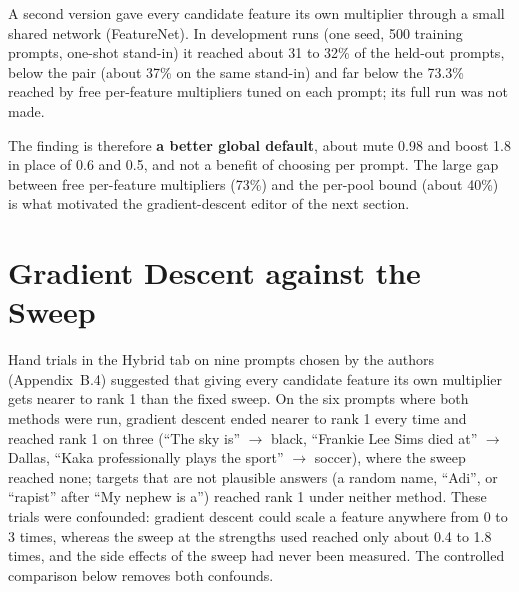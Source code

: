 \documentclass[12pt,a4paper]{report}
\begin{document}
A second version gave every candidate feature its own multiplier through a small shared network (FeatureNet). In development runs (one seed, 500 training prompts, one-shot stand-in) it reached about 31 to 32\% of the held-out prompts, below the pair (about 37\% on the same stand-in) and far below the 73.3\% reached by free per-feature multipliers tuned on each prompt; its full run was not made.

The finding is therefore \textbf{a better global default}, about mute 0.98 and boost 1.8 in place of 0.6 and 0.5, and not a benefit of choosing per prompt. The large gap between free per-feature multipliers (73\%) and the per-pool bound (about 40\%) is what motivated the gradient-descent editor of the next section.


\section{Gradient Descent against the Sweep}\label{sec:gdvs}

Hand trials in the Hybrid tab on nine prompts chosen by the authors (Appendix~B.4) suggested that giving every candidate feature its own multiplier gets nearer to rank 1 than the fixed sweep. On the six prompts where both methods were run, gradient descent ended nearer to rank 1 every time and reached rank 1 on three (``The sky is'' $\rightarrow$ black, ``Frankie Lee Sims died at'' $\rightarrow$ Dallas, ``Kaka professionally plays the sport'' $\rightarrow$ soccer), where the sweep reached none; targets that are not plausible answers (a random name, ``Adi'', or ``rapist'' after ``My nephew is a'') reached rank 1 under neither method. These trials were confounded: gradient descent could scale a feature anywhere from 0 to 3 times, whereas the sweep at the strengths used reached only about 0.4 to 1.8 times, and the side effects of the sweep had never been measured. The controlled comparison below removes both confounds.
\end{document}

